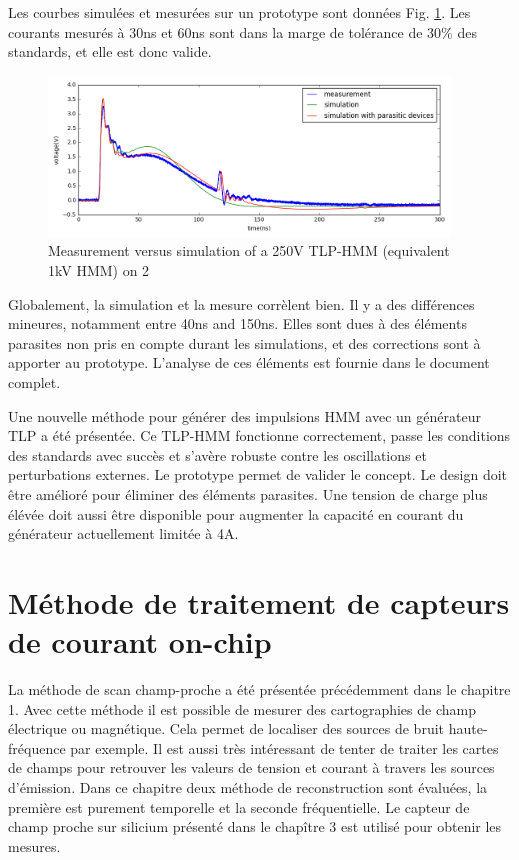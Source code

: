 Les courbes simulées et mesurées sur un prototype sont données Fig. \ref{fig:tlp_hmm_waveforms}.
Les courants mesurés à 30ns et 60ns sont dans la marge de tolérance de 30\% des standards, et elle est donc valide.

\begin{figure}[!h]
  \centering
  \includegraphics[width=0.95\textwidth]{src/1/figures/tlp_hmm_waveforms.png}
  \caption{Measurement versus simulation of a 250V TLP-HMM (equivalent 1kV HMM) on 2\textOmega{}}
  \label{fig:tlp_hmm_waveforms}
\end{figure}

Globalement, la simulation et la mesure corrèlent bien.
Il y a des différences mineures, notamment entre 40ns and 150ns.
Elles sont dues à des éléments parasites non pris en compte durant les simulations, et des corrections sont à apporter au prototype.
L'analyse de ces éléments est fournie dans le document complet.

Une nouvelle méthode pour générer des impulsions HMM avec un générateur TLP a été présentée.
Ce TLP-HMM fonctionne correctement, passe les conditions des standards avec succès et s'avère robuste contre les oscillations et perturbations externes.
Le prototype permet de valider le concept.
Le design doit être amélioré pour éliminer des éléments parasites.
Une tension de charge plus élévée doit aussi être disponible pour augmenter la capacité en courant du générateur actuellement limitée à 4A.

\section{Méthode de traitement de capteurs de courant on-chip}

La méthode de scan champ-proche a été présentée précédemment dans le chapitre 1.
Avec cette méthode il est possible de mesurer des cartographies de champ électrique ou magnétique.
Cela permet de localiser des sources de bruit haute-fréquence par exemple.
Il est aussi très intéressant de tenter de traiter les cartes de champs pour retrouver les valeurs de tension et courant à travers les sources d'émission.
Dans ce chapitre deux méthode de reconstruction sont évaluées, la première est purement temporelle et la seconde fréquentielle.
Le capteur de champ proche sur silicium présenté dans le chapître 3 est utilisé pour obtenir les mesures.

